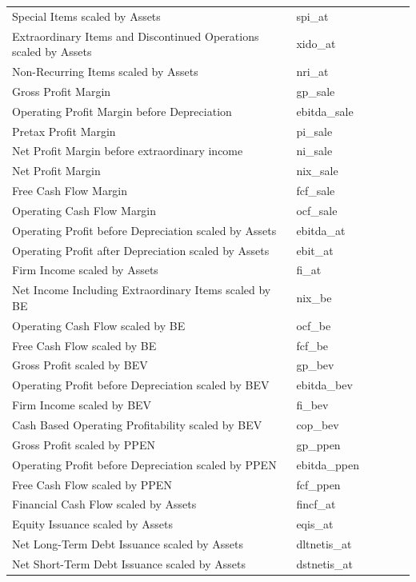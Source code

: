 \documentclass[12pt,title,fleqn]{article}
\begin{document}
\begin{longtable}{p{5cm}p{2cm}p{5cm}lll}
Special Items scaled by Assets & spi\_at & & & & \\
Extraordinary Items and Discontinued Operations scaled by Assets & xido\_at & & & & \\
Non-Recurring Items scaled by Assets & nri\_at & & & & \\
Gross Profit Margin & gp\_sale & & & & \\
Operating Profit Margin before Depreciation & ebitda\_sale & & & & \\
Pretax Profit Margin & pi\_sale & & & & \\
Net Profit Margin before extraordinary income & ni\_sale & & & & \\
Net Profit Margin & nix\_sale & & & & \\
Free Cash Flow Margin & fcf\_sale & & & & \\
Operating Cash Flow Margin & ocf\_sale & & & & \\
Operating Profit before Depreciation scaled by Assets & ebitda\_at & & & & \\
Operating Profit after Depreciation scaled by Assets & ebit\_at & & & & \\
Firm Income scaled by Assets & fi\_at & & & & \\
Net Income Including Extraordinary Items scaled by BE & nix\_be & & & & \\
Operating Cash Flow scaled by BE & ocf\_be & & & & \\
Free Cash Flow scaled by BE & fcf\_be & & & & \\
Gross Profit scaled by BEV & gp\_bev & & & & \\
Operating Profit before Depreciation scaled by BEV & ebitda\_bev & & & & \\
Firm Income scaled by BEV & fi\_bev & & & & \\
Cash Based Operating Profitability scaled by BEV & cop\_bev & & & & \\
Gross Profit scaled by PPEN & gp\_ppen & & & & \\
Operating Profit before Depreciation scaled by PPEN & ebitda\_ppen & & & & \\
Free Cash Flow scaled by PPEN & fcf\_ppen & & & & \\
Financial Cash Flow scaled by Assets & fincf\_at & & & & \\
Equity Issuance scaled by Assets & eqis\_at & & & & \\
Net Long-Term Debt Issuance scaled by Assets & dltnetis\_at & & & & \\
Net Short-Term Debt Issuance scaled by Assets & dstnetis\_at & & & & \\

\end{longtable}
\end{document}
